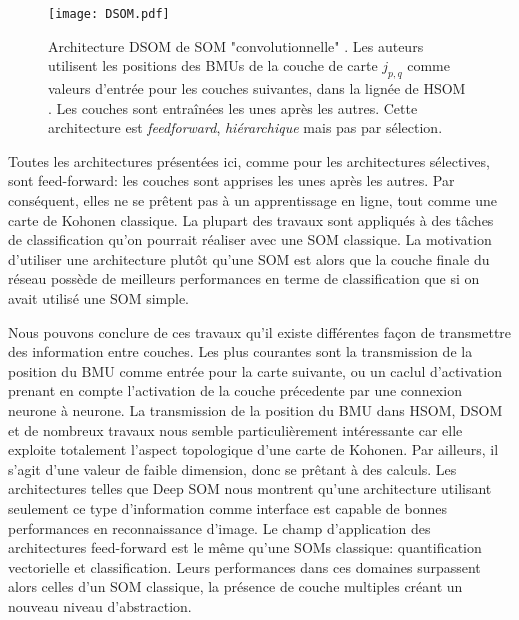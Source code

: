 \documentclass[../main]{subfiles}
\begin{document}
\begin{figure}
    \texttt{[image: DSOM.pdf]}
    \caption{Architecture DSOM de SOM "convolutionnelle" \cite{liu_deep_2015}. Les auteurs utilisent les positions des BMUs de la couche de carte $j_{p,q}$ comme valeurs d'entrée pour les couches suivantes, dans la lignée de HSOM \cite{lampinen_clustering_1992}. Les couches sont entraînées les unes après les autres. Cette architecture est \emph{feedforward}, \emph{hiérarchique} mais pas par sélection. \label{fig:dsom}}
\end{figure}

Toutes les architectures présentées ici, comme pour les architectures sélectives, sont feed-forward: les couches sont apprises les unes après les autres. 
Par conséquent, elles ne se prêtent pas à un apprentissage en ligne, tout comme une carte de Kohonen classique.
La plupart des travaux sont appliqués à des tâches de classification qu'on pourrait réaliser avec une SOM classique.
La motivation d'utiliser une architecture plutôt qu'une SOM est alors que la couche finale du réseau possède de meilleurs performances en terme de classification que si on avait utilisé une SOM simple.


Nous pouvons conclure de ces travaux qu'il existe différentes façon de transmettre des information entre couches. Les plus courantes sont la transmission de la position du BMU comme entrée pour la carte suivante, ou un caclul d'activation prenant en compte l'activation de la couche précedente par une connexion neurone à neurone.
La transmission de la position du BMU dans HSOM, DSOM et de nombreux travaux nous semble particulièrement intéressante car elle exploite totalement l'aspect topologique d'une carte de Kohonen. Par ailleurs, il s'agit d'une valeur de faible dimension, donc se prêtant à des calculs. Les architectures telles que Deep SOM nous montrent qu'une architecture utilisant seulement ce type d'information comme interface est capable de bonnes performances en reconnaissance d'image.
Le champ d'application des architectures feed-forward est le même qu'une SOMs classique: quantification vectorielle et classification. Leurs performances dans ces domaines surpassent alors celles d'un SOM classique, la présence de couche multiples créant un nouveau niveau d'abstraction.
\end{document}
